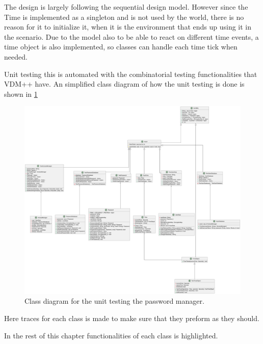 The design is largely following the sequential design model. However since the
Time is implemented as a singleton and is not used by the world, there is no
reason for it to initialize it, when it is the environment that ends up using
it in the scenario. Due to the model also to be able to react on different time
events, a time object is also implemented, so classes can handle each time tick
when needed.

Unit testing this is automated with the combinatorial testing functionalities
that VDM++ have. An simplified class diagram of how the unit testing is done is
shown in \cref{fig:design:test}

\begin{figure}[H]
    \centering
    \includegraphics[width=13cm]{prj/figs/Test.pdf}
    \caption{Class diagram for the unit testing the password manager.}
    \label{fig:design:test}
\end{figure}

Here traces for each class is made to make sure that they preform as they
should. 

In the rest of this chapter functionalities of each class is highlighted.

